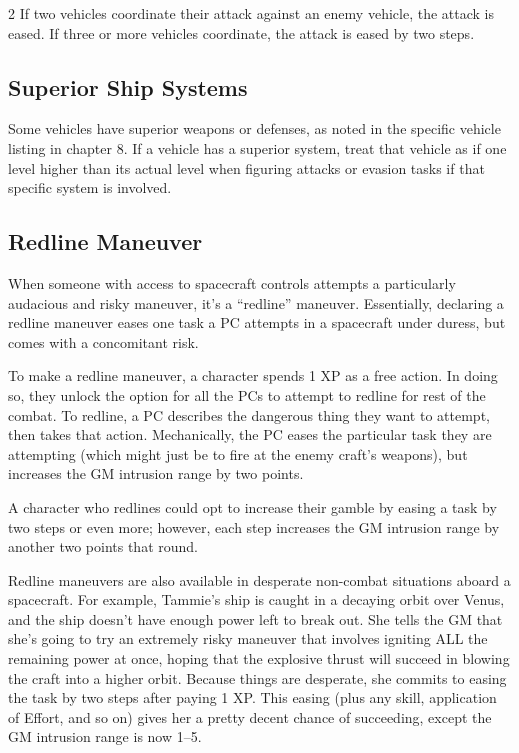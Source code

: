 \begin{multicols}{2}
If two vehicles coordinate their attack against an enemy vehicle, the attack is eased. If three or more vehicles coordinate, the attack is eased by two steps. 

\subsection{Superior Ship Systems}

Some vehicles have superior weapons or defenses, as noted in the specific vehicle listing in chapter 8. If a vehicle has a superior system, treat that vehicle as if one level higher than its actual level when figuring attacks or evasion tasks if that specific system is involved.

\subsection{Redline Maneuver}

When someone with access to spacecraft controls attempts a particularly audacious and risky maneuver, it’s a “redline” maneuver. Essentially, declaring a redline maneuver eases one task a PC attempts in a spacecraft under duress, but comes with a concomitant risk. 

To make a redline maneuver, a character spends 1 XP as a free action. In doing so, they unlock the option for all the PCs to attempt to redline for rest of the combat. To redline, a PC describes the dangerous thing they want to attempt, then takes that action. Mechanically, the PC eases the particular task they are attempting (which might just be to fire at the enemy craft’s weapons), but increases the GM intrusion range by two points. 

A character who redlines could opt to increase their gamble by easing a task by two steps or even more; however, each step increases the GM intrusion range by another two points that round. 

Redline maneuvers are also available in desperate non-combat situations aboard a spacecraft. For example, Tammie’s ship is caught in a decaying orbit over Venus, and the ship doesn’t have enough power left to break out. She tells the GM that she’s going to try an extremely risky maneuver that involves igniting ALL the remaining power at once, hoping that the explosive thrust will succeed in blowing the craft into a higher orbit. Because things are desperate, she commits to easing the task by two steps after paying 1 XP. This easing (plus any skill, application of Effort, and so on) gives her a pretty decent chance of succeeding, except the GM intrusion range is now 1–5. 


\end{multicols}
